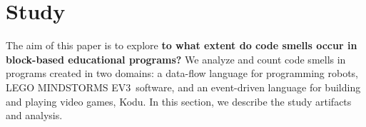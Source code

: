 \documentclass[conference]{IEEEtran}
\newcommand{\ms}{LEGO MINDSTORMS EV3}
\newcommand{\mbs}{\textsc{my blocks}}
\newcommand{\mb}{\textsc{my block}}
\begin{document}
%

\section{Study}
\label{sec:study}
The aim of this paper is to explore \textbf{to what extent do code smells occur in block-based educational programs?} 
We analyze and count code smells in programs created in two domains: a data-flow language for programming robots, \ms~software,  and an event-driven language for building and playing video games, Kodu. 
In this section, we describe the study artifacts and analysis. 
\end{document}
